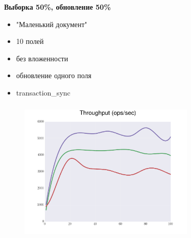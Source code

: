 \documentclass[usenames,dvipsnames, 18pt, compress, aspectratio=169]{beamer}
\begin{document}
\begin{frame}
    \frametitle{}
    \begin{center}
        \textbf{Выборка 50\%, обновление 50\%}
        \begin{itemize}[label={}]
            \item "Маленький документ"
            \item 10 полей
            \item без вложенности
            \item обновление одного поля
            \item transaction\_sync
        \end{itemize}
    \end{center}
\end{frame}

\begin{frame}
    \frametitle{}
    \begin{center}
    \begin{figure}
        \includegraphics[width=0.75\textwidth,center]{benchmarks/workload_a_mongo_config/throughput.png}
    \end{figure}
    \end{center}
\end{frame}
\end{document}

